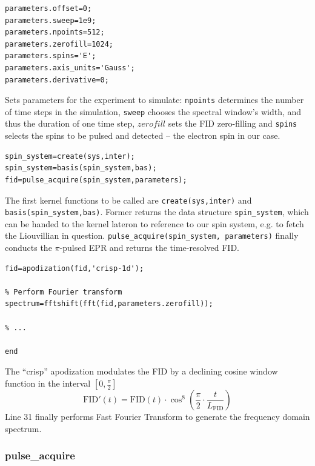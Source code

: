 \documentclass[11.5pt,a4paper]{article}
\begin{document}
\begin{lstlisting}[firstnumber=last]
% Set the sequence parameters
parameters.offset=0;
parameters.sweep=1e9;
parameters.npoints=512;
parameters.zerofill=1024;
parameters.spins='E';
parameters.axis_units='Gauss';
parameters.derivative=0;
\end{lstlisting}
Sets parameters for the experiment to simulate: \verb$npoints$ determines the number of time steps in the simulation, \verb$sweep$ chooses the spectral window's width, and thus the duration of one time step, $zerofill$ sets the FID zero-filling and \verb$spins$ selects the spins to be pulsed and detected -- the electron spin in our case.
\begin{lstlisting}[firstnumber=last]
% Run Spinach
spin_system=create(sys,inter);
spin_system=basis(spin_system,bas);
fid=pulse_acquire(spin_system,parameters);
\end{lstlisting}
The first kernel functions to be called are \verb$create(sys,inter)$ and \verb$basis(spin_system,bas)$. Former returns the data structure \verb$spin_system$, which can be handed to the kernel lateron to reference to our spin system, e.g. to fetch the Liouvillian in question.
\verb$pulse_acquire(spin_system, parameters)$ finally conducts the $\pi$-pulsed EPR and returns the time-resolved FID.
\begin{lstlisting}[firstnumber=last]
% Apodization
fid=apodization(fid,'crisp-1d');

% Perform Fourier transform
spectrum=fftshift(fft(fid,parameters.zerofill));

% ...

end
\end{lstlisting}
The ``crisp'' apodization modulates the FID by a declining cosine window function in the interval $[0,\tfrac{\pi}{2}]$
\begin{equation}
 \text{FID}'(t) = \text{FID}(t) \cdot \cos^8 \left( \frac{\pi}{2} \cdot \frac{t}{L_\text{FID}} \right)
\end{equation}
Line 31 finally performs Fast Fourier Transform to generate the frequency domain spectrum.


\subsubsection{pulse\_acquire}
\end{document}

